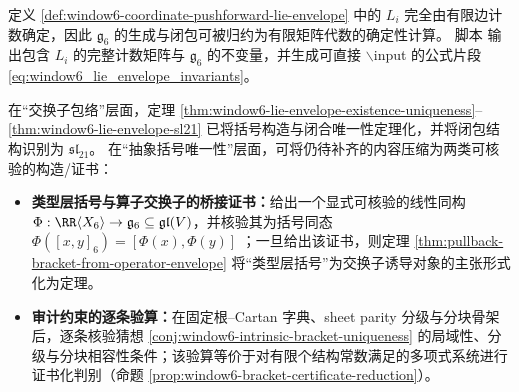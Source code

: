 \begin{remark}[可审计证书接口]\label{rem:window6-lie-envelope-audit-route}
定义 \ref{def:window6-coordinate-pushforward-lie-envelope} 中的 \(L_i\) 完全由有限边计数确定，因此 \(\mathfrak{g}_6\) 的生成与闭包可被归约为有限矩阵代数的确定性计算。
脚本 \texttt{} 输出包含 \(L_i\) 的完整计数矩阵与 \(\mathfrak{g}_6\) 的不变量，并生成可直接 \(\backslash\)input 的公式片段 \eqref{eq:window6_lie_envelope_invariants}。
\end{remark}




\begin{remark}[从审计对象到定理链条的缺口定位]\label{rem:window6-bracket-closure-gaps}
在“交换子包络”层面，定理 \ref{thm:window6-lie-envelope-existence-uniqueness}--\ref{thm:window6-lie-envelope-sl21} 已将括号构造与闭合唯一性定理化，并将闭包结构识别为 \(\mathfrak{sl}_{21}\)。
在“抽象括号唯一性”层面，可将仍待补齐的内容压缩为两类可核验的构造/证书：
\begin{itemize}
  \item \textbf{类型层括号与算子交换子的桥接证书：}给出一个显式可核验的线性同构 \(\Phi:\RR\langle X_6\rangle\to\mathfrak{g}_6\subseteq\mathfrak{gl}(V)\)，并核验其为括号同态
  \(
  \Phi([x,y]_6)=[\Phi(x),\Phi(y)]
  \)
 ；一旦给出该证书，则定理 \ref{thm:pullback-bracket-from-operator-envelope} 将“类型层括号”为交换子诱导对象的主张形式化为定理。
  \item \textbf{审计约束的逐条验算：}在固定根--Cartan 字典、sheet parity 分级与分块骨架后，逐条核验猜想 \ref{conj:window6-intrinsic-bracket-uniqueness} 的局域性、分级与分块相容性条件；该验算等价于对有限个结构常数满足的多项式系统进行证书化判别（命题 \ref{prop:window6-bracket-certificate-reduction}）。
\end{itemize}
\end{remark}

